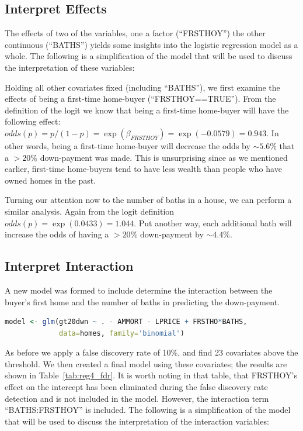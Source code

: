 \documentclass[11pt, fleqn]{article}
\begin{document}


\subsection{Interpret Effects}
The effects of two of the variables, one a factor (``FRSTHOY'') the other continuous (``BATHS'') yields some insights into the logistic regression model as a whole.  The following is a simplification of the model that will be used to discuss the interpretation of these variables:


Holding all other covariates fixed (including ``BATHS''), we first examine the effects of being a first-time home-buyer (``FRSTHOY==TRUE'').  From the definition of the logit we know that being a first-time home-buyer will have the following effect: $odds(p)=p/(1-p)=\exp(\beta_{FRSTHOY})=\exp(-0.0579)=0.943$.  In other words, being a first-time home-buyer will decrease the odds by $\sim5.6\%$ that a $>20\%$ down-payment was made.  This is unsurprising since as we mentioned earlier, first-time home-buyers tend to have less wealth than people who have owned homes in the past.

Turning our attention now to the number of baths in a house, we can perform a similar analysis.  Again from the logit definition $odds(p)=\exp(0.0433)=1.044$.  Put another way, each additional bath will increase the odds of having a $>20\%$ down-payment by $\sim4.4\%$.

\subsection{Interpret Interaction}
A new model was formed to include determine the interaction between the buyer's first home and the number of baths in predicting the down-payment.

\begin{lstlisting}[language=R]
model <- glm(gt20dwn ~ . - AMMORT - LPRICE + FRSTHO*BATHS, 
             data=homes, family='binomial')
\end{lstlisting}

As before we apply a false discovery rate of 10\%, and find 23 covariates above the threshold.  We then created a final model using these covariates; the results are shown in Table~\vref{tab:reg4_fdr}.  It is worth noting in that table, that FRSTHOY's effect on the intercept has been eliminated during the false discovery rate detection and is not included in the model.  However, the interaction term ``BATHS:FRSTHOY'' is included.  The following is a simplification of the model that will be used to discuss the interpretation of the interaction variables:
\end{document}
